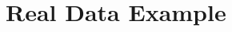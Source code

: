 \documentclass[11pt]{article}
\theoremstyle{definition}
\begin{document}



\section{Real Data Example}
\label{sec:real}
\end{document}
